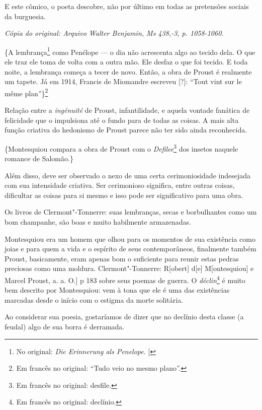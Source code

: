 E este cômico, o poeta descobre, não por último em todas as pretensões
sociais da burguesia.

\begin{flushright}
\emph{\small{Cópia do original: Arquivo Walter Benjamin, Ms 438,-3, p. 1058-1060.}}
\end{flushright}

\{A lembrança\footnote{No original: \emph{Die Erinnerung als Penelope}. {[}\versal{N. T.}{]}} como Penélope --- o dia não acrescenta algo ao tecido dela.
O que ele traz ele toma de volta com a outra mão. Ele desfaz
o que foi tecido. E toda noite, a lembrança começa a tecer de novo.
Então, a obra de Proust é realmente um tapete. Já em 1914, Francis de
Miomandre escreveu {[}?{]}: ``Tout vint sur le même plan''\}\footnote{Em francês no original: ``Tudo veio no mesmo plano''. \versal{[N. T.]}}

Relação entre a \emph{ingénuité} de Proust, infantilidade, e aquela
vontade fanática de felicidade que o impulsiona até o fundo para de
todas as coisas. A mais alta função criativa do hedonismo de Proust
parece não ter sido ainda reconhecida.

\{Montesquiou compara a obra de Proust com o \emph{Defilee}\footnote{Em francês no original: desfile. \versal{[N. T.]}} dos insetos naquele romance de
Salomão.\}

Além disso, deve ser observado o nexo de uma certa cerimoniosidade
indesejada com sua intensidade criativa. Ser cerimonioso significa,
entre outras coisas, dificultar as coisas para si mesmo e isso pode ser
significativo para uma obra.

Os livros de Clermont"-Tonnerre: suas lembranças, secas e borbulhantes
como um bom champanhe, são boas e muito habilmente armazenadas.

Montesquiou era um homem que olhou para os momentos de sua existência
como joias e para quem a vida e o espírito de seus contemporâneos,
finalmente também Proust, basicamente, eram apenas bom o suficiente para
reunir estas pedras preciosas como uma moldura. Clermont"-Tonnerre: R{[}obert{]} d{[}e{]} M{[}ontesquiou{]} e Marcel Proust, a. a. O.{]} p
183 sobre seus poemas de guerra. O \emph{déclin}\footnote{Em francês no original: declínio. \versal{[N. T.]}} é muito bem descrito por
Montesquiou: vem à tona que ele é uma das existências marcadas desde o
início com o estigma da morte solitária.

Ao considerar sua poesia, gostaríamos de dizer que no declínio desta
classe (a feudal) algo de sua borra é derramada.

